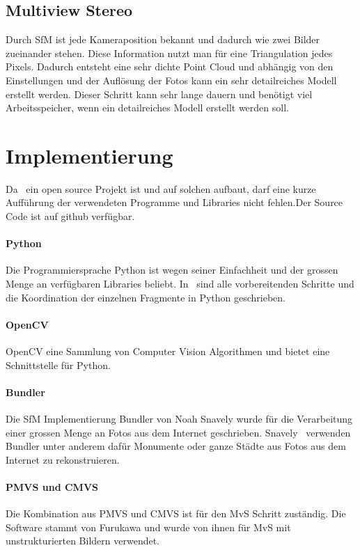 		\subsection{Multiview Stereo} \label{mvs}
			Durch SfM ist jede Kameraposition bekannt und dadurch wie zwei Bilder zueinander stehen. Diese Information nutzt man für eine Triangulation jedes Pixels. Dadurch entsteht eine sehr dichte Point Cloud und abhängig von den Einstellungen und der Auflösung der Fotos kann ein sehr detailreiches Modell erstellt werden.
			Dieser Schritt kann sehr lange dauern und benötigt viel Arbeitsspeicher, wenn ein detailreiches Modell erstellt werden soll.

	\section{Implementierung}  \label{imp:tech}
		Da \dronarch\ ein open source Projekt ist und auf solchen aufbaut, darf eine kurze Aufführung der verwendeten Programme und Libraries nicht fehlen.Der Source Code ist auf github verfügbar. %
		
		\paragraph{Python}
			Die Programmiersprache Python  ist wegen seiner Einfachheit und der grossen Menge an verfügbaren Libraries beliebt.
			In \dronarch\ sind alle vorbereitenden Schritte und die Koordination der einzelnen Fragmente in Python geschrieben.
			
		\paragraph{OpenCV}
			OpenCV eine Sammlung von Computer Vision Algorithmen und bietet eine Schnittstelle für Python.
						
		\paragraph{Bundler}
			Die SfM Implementierung Bundler von Noah Snavely wurde für die Verarbeitung einer grossen Menge an Fotos aus dem Internet geschrieben. Snavely \etal\ verwenden Bundler unter anderem dafür Monumente  oder ganze Städte  aus Fotos aus dem Internet zu rekonstruieren.

		\paragraph{PMVS und CMVS}
			Die Kombination aus PMVS und CMVS ist für den MvS Schritt zuständig. Die Software stammt von Furukawa \etal{} und wurde von ihnen für MvS mit unstrukturierten Bildern verwendet.
		